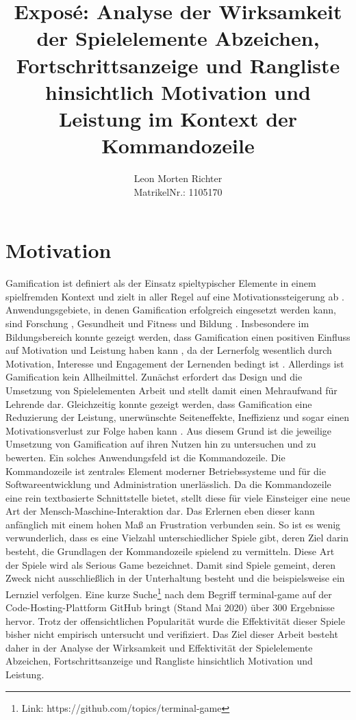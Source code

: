 \documentclass[
    a4paper,
    doc,
    12pt,
    natbib,
]{apa6}
\title{Exposé: Analyse der Wirksamkeit  der Spielelemente Abzeichen, Fortschrittsanzeige und Rangliste hinsichtlich Motivation und Leistung im Kontext der Kommandozeile}
\author{Leon Morten Richter\\MatrikelNr.: 1105170}
\affiliation{Christian-Albrechts-Universität zu Kiel}
\begin{document}
\maketitle

\section{Motivation}
Gamification ist definiert als der Einsatz spieltypischer Elemente in einem spielfremden Kontext \citep{deterding_gamification_2011} und zielt in aller Regel auf eine Motivationssteigerung ab \citep{noauthor_gamification_2010}. Anwendungsgebiete, in denen Gamification erfolgreich eingesetzt werden kann, sind Forschung \citep{brauer_erhohung_2019}, Gesundheit und Fitness \citep{johnson_gamification_2016} und Bildung \citep{de_freitas_prepared_2006}. Insbesondere im Bildungsbereich konnte gezeigt werden, dass Gamification einen positiven Einfluss auf Motivation und Leistung haben kann \citep{ibanez_gamification_2014}, da der Lernerfolg wesentlich durch Motivation, Interesse und Engagement der Lernenden bedingt ist \citep{astin_student_1984}. Allerdings ist Gamification kein Allheilmittel. Zunächst erfordert das Design und die Umsetzung von Spielelementen Arbeit und stellt damit einen Mehraufwand für Lehrende dar. Gleichzeitig konnte gezeigt werden, dass Gamification eine Reduzierung der Leistung, unerwünschte Seiteneffekte, Ineffizienz und sogar einen Motivationsverlust zur Folge haben kann \citep{toda_dark_2018}. Aus diesem Grund ist die jeweilige Umsetzung von Gamification auf ihren Nutzen hin zu untersuchen und zu bewerten. Ein solches Anwendungsfeld ist die Kommandozeile. Die Kommandozeile ist zentrales Element moderner Betriebssysteme und für die Softwareentwicklung und Administration unerlässlich. Da die Kommandozeile eine rein textbasierte Schnittstelle bietet, stellt diese für viele Einsteiger eine neue Art der Mensch-Maschine-Interaktion dar. Das Erlernen eben dieser kann anfänglich mit einem hohen Maß an Frustration verbunden sein. So ist es wenig verwunderlich, dass es eine Vielzahl unterschiedlicher Spiele gibt, deren Ziel darin besteht, die Grundlagen der Kommandozeile spielend zu vermitteln. Diese Art der Spiele wird als Serious Game bezeichnet. Damit sind Spiele gemeint, deren Zweck nicht ausschließlich in der Unterhaltung besteht \citep{djaouti_classifying_2011} und die beispielsweise ein Lernziel verfolgen. Eine kurze Suche\footnote{Link: https://github.com/topics/terminal-game} nach dem Begriff \glqq terminal-game\grqq{} auf der Code-Hosting-Plattform GitHub bringt (Stand Mai 2020) über 300 Ergebnisse hervor. Trotz der offensichtlichen Popularität wurde die Effektivität dieser Spiele bisher nicht empirisch untersucht und verifiziert. Das Ziel dieser Arbeit besteht daher in der Analyse der Wirksamkeit und Effektivität der Spielelemente Abzeichen, Fortschrittsanzeige und Rangliste hinsichtlich Motivation und Leistung.
\end{document}
